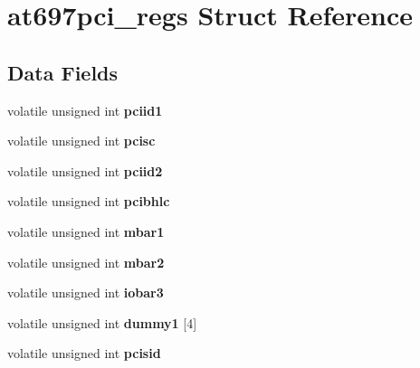 \hypertarget{structat697pci__regs}{}\section{at697pci\+\_\+regs Struct Reference}
\label{structat697pci__regs}
\subsection*{Data Fields}
\begin{DoxyCompactItemize}
\item 
\mbox{\label{structat697pci__regs_af908aa24b00ac65245c4cf157dbf151d}} 
volatile unsigned int {\bfseries pciid1}
\item 
\mbox{\label{structat697pci__regs_a7fc093d28f755fd2ffcc02ce7e7a8c52}} 
volatile unsigned int {\bfseries pcisc}
\item 
\mbox{\label{structat697pci__regs_ac8739c2b76f4ed66c5591c0dcdaf5af6}} 
volatile unsigned int {\bfseries pciid2}
\item 
\mbox{\label{structat697pci__regs_a9c9fbabb52183e600988f10afa16eee1}} 
volatile unsigned int {\bfseries pcibhlc}
\item 
\mbox{\label{structat697pci__regs_a5f8328335ab1c9991136f66b969c8062}} 
volatile unsigned int {\bfseries mbar1}
\item 
\mbox{\label{structat697pci__regs_aa50698bb3e9fafab5a802973bb17165a}} 
volatile unsigned int {\bfseries mbar2}
\item 
\mbox{\label{structat697pci__regs_a4283c94b4a39f7299d9456bdd47209e2}} 
volatile unsigned int {\bfseries iobar3}
\item 
\mbox{\label{structat697pci__regs_ab25d413555de28a47e451d5928bfcd1c}} 
volatile unsigned int {\bfseries dummy1} \mbox{[}4\mbox{]}
\item 
\mbox{\label{structat697pci__regs_ab8060e75c7a4cf7312c4477eeedece6a}} 
volatile unsigned int {\bfseries pcisid}

\end{DoxyCompactItemize}
